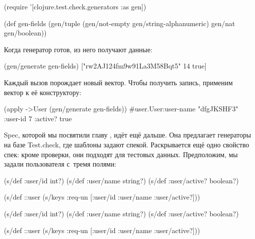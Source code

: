 \else

\begin{english}
  \begin{clojure}
(require '[clojure.test.check.generators :as gen])

(def gen-fields
  (gen/tuple (gen/not-empty gen/string-alphanumeric)
             gen/nat
             gen/boolean))
  \end{clojure}
\end{english}

\fi

Когда генератор готов, из него получают данные:

\begin{english}
  \begin{clojure}
(gen/generate gen-fields)
["rw2AJ124fm9w91La3M58Bqt5" 14 true]
  \end{clojure}
\end{english}

\noindent
Каждый вызов порождает новый вектор. Чтобы получить запись, применим вектор к её
конструктору:

\begin{english}
  \begin{clojure}
(apply ->User (gen/generate gen-fields))
#user.User{:user-name "dfgJKSHF3"
           :user-id 7
           :active? true}
  \end{clojure}
\end{english}

Spec, которой мы посвятили главу , идёт ещё дальше. Она
предлагает генераторы на базе Test.check, где шаблоны задают
спекой. Раскрывается ещё одно свойство спек: кроме проверки, они подходят для
тестовых данных. Предположим, мы задали пользователя с~тремя полями:

\ifnarrow

\begin{english}
  \begin{clojure}
(s/def :user/id int?)
(s/def :user/name string?)
(s/def :user/active? boolean?)

(s/def ::user
  (s/keys :req-un [:user/id
                   :user/name
                   :user/active?]))
  \end{clojure}
\end{english}

\else

\begin{english}
  \begin{clojure}
(s/def :user/id int?)
(s/def :user/name string?)
(s/def :user/active? boolean?)

(s/def ::user (s/keys :req-un [:user/id
                               :user/name
                               :user/active?]))
  \end{clojure}
\end{english}

